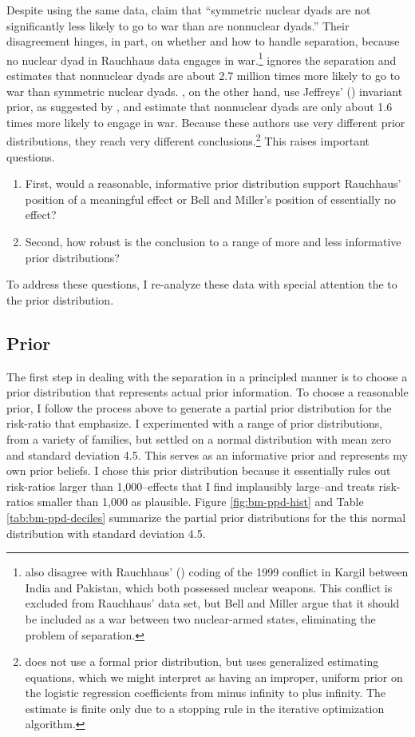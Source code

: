 \documentclass[12pt]{article}
\begin{document}
Despite using the same data, \citet[p. 9]{BellMiller2015} claim that ``symmetric nuclear dyads are not significantly less likely to go to war than are nonnuclear dyads.'' 
Their disagreement hinges, in part, on whether and how to handle separation, because no nuclear dyad in Rauchhaus data engages in war.\footnote{
\cite{BellMiller2015} also disagree with Rauchhaus' (\citeyear{Rauchhaus2009}) coding of the 1999 conflict in Kargil between India and Pakistan, which both possessed nuclear weapons. 
This conflict is excluded from Rauchhaus' data set, but Bell and Miller argue that it should be included as a war between two nuclear-armed states, eliminating the problem of separation.} 
\cite{Rauchhaus2009} ignores the separation and estimates that nonnuclear dyads are about 2.7 million times more likely to go to war than symmetric nuclear dyads.
\cite{BellMiller2015}, on the other hand, use Jeffreys' (\citeyear{Jeffreys1946}) invariant prior, as suggested by \cite{Zorn2005}, and estimate that nonnuclear dyads are only about 1.6 times more likely to engage in war. 
Because these authors use very different prior distributions, they reach very different conclusions.\footnote{
\cite{Rauchhaus2009} does not use a formal prior distribution, but uses generalized estimating equations, which we might interpret as having an improper, uniform prior on the logistic regression coefficients from minus infinity to plus infinity. 
The estimate is finite only due to a stopping rule in the iterative optimization algorithm.} 
This raises important questions. 
\begin{enumerate}
\item First, would a reasonable, informative prior distribution support Rauchhaus' position of a meaningful effect or Bell and Miller's position of essentially no effect? 
\item Second, how robust is the conclusion to a range of more and less informative prior distributions?
\end{enumerate}
To address these questions, I re-analyze these data \citep{bell-miller-data} with special attention the to the prior distribution.

\subsection*{Prior}

The first step in dealing with the separation in a principled manner is to choose a prior distribution that represents actual prior information. 
To choose a reasonable prior, I follow the process above to generate a partial prior distribution for the risk-ratio that \cite{BellMiller2015} emphasize. 
I experimented with a range of prior distributions, from a variety of families, but settled on a normal distribution with mean zero and standard deviation 4.5. 
This serves as an informative prior and represents my own prior beliefs.   
I chose this prior distribution because it essentially rules out risk-ratios larger than 1,000--effects that I find implausibly large--and treats risk-ratios smaller than 1,000 as plausible. 
Figure \ref{fig:bm-ppd-hist} and Table \ref{tab:bm-ppd-deciles} summarize the partial prior distributions for the this normal distribution with standard deviation 4.5.
\end{document}
